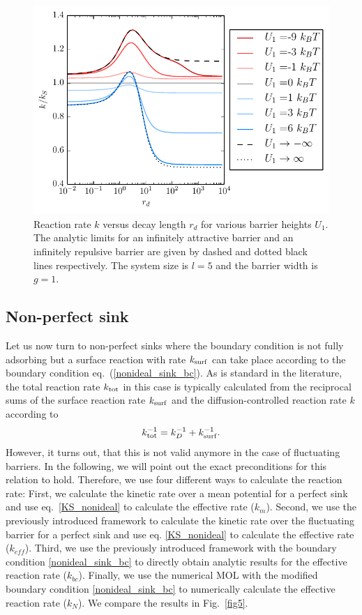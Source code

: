 \documentclass[preprint,superscriptaddress]{revtex4-1}
\begin{document}
\begin{figure}[H]
    \centering
    \includegraphics[width = .5 \textwidth]{plots/u1_dependence}
    \caption{Reaction rate $k$ versus decay length $r_d$ for various barrier heights $U_1$. The analytic limits for an infinitely attractive barrier and an infinitely repulsive barrier are given by dashed and dotted black lines respectively. The system size is $l=5$ and the barrier width is $g=1$. \label{u1_dependence}}
\end{figure}


\subsection{Non-perfect sink}

Let us now turn to non-perfect sinks where the boundary condition is not fully adsorbing but a surface reaction with rate $k_{\rm surf}$ can take 
place according to the boundary condition eq.~(\ref{nonideal_sink_bc}).  As is standard in the literature,  the total reaction rate $k_{\rm tot}$ in 
this case is typically calculated from the reciprocal sums of the surface reaction rate $k_{\rm surf}$ and the diffusion-controlled 
reaction rate $k$ according to 
\begin{equation}
    k_{\rm tot}^{-1} = k_D^{-1} + k_{\rm surf}^{-1}.
    \label{KS_nonideal}
\end{equation}
However, it turns out, that this is not valid anymore in the case of fluctuating barriers. 
In the following, we will point out the exact preconditions for this relation to hold. Therefore, we use four different ways to calculate the reaction rate: First, we calculate the kinetic rate over a mean potential for a perfect sink and use eq.~\eqref{KS_nonideal} to calculate the effective rate ($k_m$). Second, we use the previously introduced framework to calculate the kinetic rate over the fluctuating barrier for a perfect sink and use eq. \eqref{KS_nonideal} to calculate the effective rate ($k_{eff}$). Third, we use the previously introduced framework with the boundary condition \eqref{nonideal_sink_bc} to directly obtain analytic results for the effective reaction rate ($k_{bc}$). Finally,  we use the numerical MOL with the modified boundary condition \eqref{nonideal_sink_bc} to numerically calculate the effective reaction rate ($k_{N}$). We compare the results in Fig.~\ref{fig5}.
\end{document}
